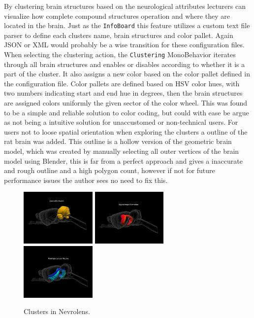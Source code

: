 By clustering brain structures based on the neurological attributes lecturers can visualize how complete compound structures operation and where they are located in the brain. Just as the \texttt{InfoBoard} this feature utilizes a custom text file parser to define each clusters name, brain structures and color pallet. Again JSON or XML would probably be a wise transition for these configuration files. 
When selecting the clustering action, the \texttt{Clustering} MonoBehavior iterates through all brain structures and enables or disables according to whether it is a part of the cluster. It also assigns a new color based on the color pallet defined in the configuration file. Color pallets are defined based on HSV color hues, with two numbers indicating start and end hue in degrees, then the brain structures are assigned colors uniformly the given sector of the color wheel. This was found to be a simple and reliable solution to color coding, but could with ease be argue as not being a intuitive solution for unaccustomed or non-technical users. 
For users not to loose spatial orientation when exploring the clusters a outline of the rat brain was added. This outline is a hollow version of the geometric brain model, which was created by manually selecting all outer vertices of the brain model using Blender, this is far from a perfect approach and gives a inaccurate and rough outline and a high polygon count, however if not for future performance issues the author sees no need to fix this.


\begin{figure}[H]
    \includegraphics[width=0.33\textwidth]{fig/cluster1.png}
    \includegraphics[width=0.33\textwidth]{fig/cluster2.png}
    \includegraphics[width=0.33\textwidth]{fig/cluster3.png}
    \caption{Clusters in Nevrolens.}
    \label{fig:clustering}
\end{figure}



